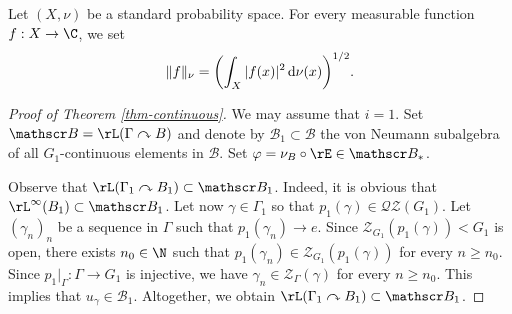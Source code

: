 Let $(X, \nu)$ be a standard probability space. For every measurable function \hbox{$f : X \to \C$}, we set
\[
\|f\|_{\nu} = \biggl( \int_X |f(x)|^2 \, {\rm d}\nu(x)\biggr)^{1/2}.
\]

\begin{proof}[Proof of Theorem \ref{thm-continuous}]
We may assume that $i = 1$. Set $\mathscr B = \rL(\Gamma \curvearrowright B)$ and denote by $\mathscr B_1 \subset \mathscr B$ the von Neumann subalgebra of all $G_1$-continuous elements in $\mathscr B$. Set $\varphi = \nu_B \circ \rE \in \mathscr B_\ast$.

Observe that $\rL(\Gamma_1 \curvearrowright B_1) \subset \mathscr B_1$. Indeed, it is obvious that $\rL^\infty(B_1) \subset \mathscr B_1$. Let now $\gamma \in \Gamma_1$ so that $p_1(\gamma) \in \mathscr{Q}\mathscr{Z}(G_1)$. Let $(\gamma_n)_n$ be a sequence in $\Gamma$ such that $p_1(\gamma_n) \to e$. Since $\mathscr Z_{G_1}(p_1(\gamma)) < G_1$ is open, there exists $n_0 \in \N$ such that $p_1(\gamma_n) \in \mathscr Z_{G_1}(p_1(\gamma))$ for every $n \geq n_0$. Since $p_1|_\Gamma : \Gamma \to G_1$ is injective, we have $\gamma_n \in \mathscr Z_\Gamma(\gamma)$ for every $n \geq n_0$. This implies that $u_\gamma \in \mathscr B_1$. Altogether, we obtain $\rL(\Gamma_1 \curvearrowright B_1) \subset \mathscr B_1$.


\end{proof}

